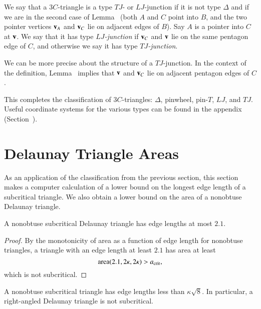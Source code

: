 \begin{definition}
  We say that a $3C$-triangle is a type $TJ$- or $LJ$-junction if it
  is not type $\Delta$ and if we are in the second case of
  Lemma~ (both $A$ and $C$ point into $B$, and the two
  pointer vertices ${\mathbf v}_A$ and ${\mathbf v}_C$ lie on adjacent edges of $B$).
  Say $A$ is a pointer into $C$ at ${\mathbf v}$.  We say that it has type {\it
    $LJ$-junction} if ${\mathbf v}_C$ and ${\mathbf v}$ lie on the same pentagon edge of
  $C$, and otherwise we say it has type {\it $TJ$-junction}.
\end{definition}

We can be more precise about the structure of a $TJ$-junction.  In the
context of the definition, Lemma~ implies that ${\mathbf v}$
and ${\mathbf v}_C$ lie on adjacent pentagon edges of $C$.

This completes the classification of $3C$-triangles: $\Delta$,
pinwheel, pin-$T$, $LJ$, and $TJ$.  Useful coordinate systems for the
various types can be found in the appendix
(Section~).

\section{Delaunay Triangle Areas}

As an application of the classification from the previous section,
this section makes a computer calculation of a lower bound on the
longest edge length of a subcritical triangle.  We also obtain a lower
bound on the area of a nonobtuse Delaunay triangle.

\begin{lemma} 
  A nonobtuse subcritical Delaunay triangle has edge lengths at most $2.1$.
\end{lemma}

\begin{proof} By the monotonicity of area as a function of edge length
  for nonobtuse triangles, a triangle with an edge length at least
  $2.1$ has area at least
\[
{\operatorname{area}}(2.1,2\kappa,2\kappa) > a_\text{crit},
\] %
which is not subcritical.
\end{proof}

\begin{lemma} 
  A nonobtuse subcritical triangle has edge lengths less than
  $\kappa\sqrt8$.  In particular, a right-angled Delaunay triangle is
  not subcritical.
\end{lemma}

